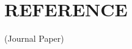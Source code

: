 \chapter*{\rm \large \bf REFERENCE}
\vspace{4.0mm}
\setlength{\parindent}{1cm} 

\scriptsize{(Journal Paper)}

\newpage
